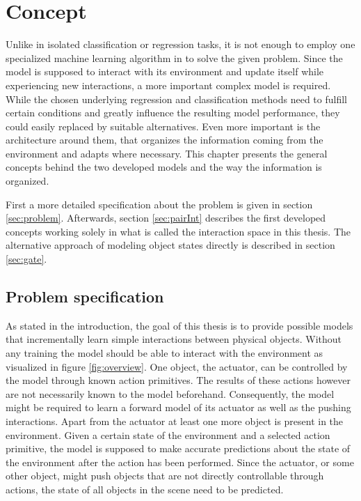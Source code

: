 \chapter{Concept \label{chap:concept}}


Unlike in isolated classification or regression tasks, it is not enough to employ one specialized machine learning algorithm in to solve the given problem. Since the model is supposed to interact with its environment and update itself while experiencing new interactions, a more important complex model is required. While the chosen underlying regression and classification methods need to fulfill certain conditions and greatly influence the resulting model performance, they could easily replaced by suitable alternatives. Even more important is the architecture around them, that organizes the information coming from the environment and adapts where necessary. This chapter presents the general concepts behind the two developed models and the way the information is organized.

First a more detailed specification about the problem is given in section \ref{sec:problem}. Afterwards,
section \ref{sec:pairInt} describes the first developed concepts working solely in what is called the interaction space in this thesis. The alternative approach of modeling object states directly is described in section \ref{sec:gate}.

\section{Problem specification \label{sec:problem}}

As stated in the introduction, the goal of this thesis is to provide possible models that incrementally learn simple interactions between physical objects. Without any training the model should be able to interact with the environment as visualized in figure \ref{fig:overview}. %
One object, the actuator, can be controlled by the model through known action primitives. The results of these actions however are not necessarily known to the model beforehand. Consequently, the model might be required to learn a forward model of its actuator as well as the pushing interactions. Apart from the actuator at least one more object is present in the environment. Given a certain state of the environment and a selected action primitive, the model is supposed to make accurate predictions about the state of the environment after the action has been performed. Since the actuator, or some other object, might push objects that are not directly controllable through actions, the state of all objects in the scene need to be predicted. 


